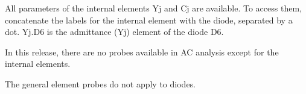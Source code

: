 All parameters of the internal elements Yj and Cj are available.  To
access them, concatenate the labels for the internal element with the
diode, separated by a dot.  Yj.D6 is the admittance (Yj) element of
the diode D6.

In this release, there are no probes available in AC analysis except
for the internal elements.

The general element probes do not apply to diodes.
